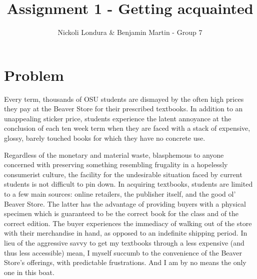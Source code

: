 \documentclass[12pt]{article}
\title{Assignment 1 - Getting acquainted}
\author{Nickoli Londura \& Benjamin Martin - Group 7}
\begin{document}
\maketitle
\tableofcontents



\section{Problem}
\par Every term, thousands of OSU students are dismayed by the often high prices they pay at the Beaver Store for their prescribed textbooks. In addition to an unappealing sticker price, students experience the latent annoyance at the conclusion of each ten week term when they are faced with a stack of expensive, glossy, barely touched books for which they have no concrete use. 
\par Regardless of the monetary and material waste, blasphemous to anyone concerned with preserving something resembling frugality in a hopelessly consumerist culture, the facility for the undesirable situation faced by current students is not difficult to pin down. In acquiring textbooks, students are limited to a few main sources: online retailers, the publisher itself, and the good ol’ Beaver Store. The latter has the advantage of providing buyers with a physical specimen which is guaranteed to be the correct book for the class and of the correct edition. The buyer experiences the immediacy of walking out of the store with their merchandise in hand, as opposed to an indefinite shipping period. In lieu of the aggressive savvy to get my textbooks through a less expensive (and thus less accessible) mean, I myself succumb to the convenience of the Beaver Store’s offerings, with predictable frustrations. And I am by no means the only one in this boat.
\end{document}
